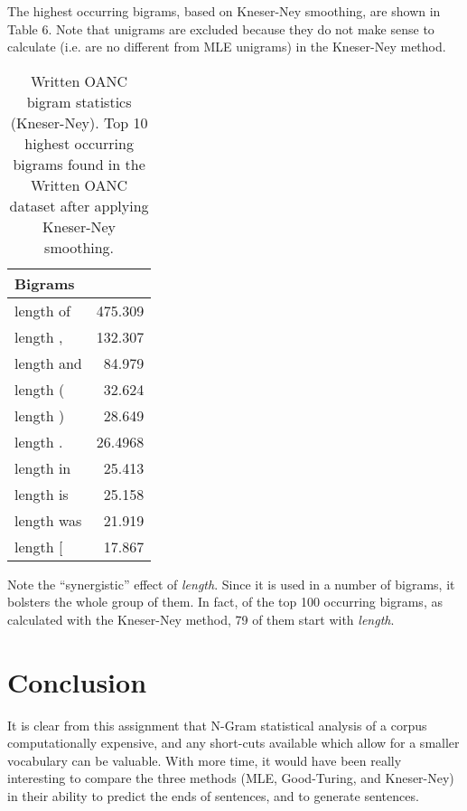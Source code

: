 \documentclass[11pt]{article}
\begin{document}
The highest occurring bigrams, based on Kneser-Ney smoothing, are shown in Table 6. Note
that unigrams are excluded because they do not make sense to calculate (i.e. are no different
from MLE unigrams) in the Kneser-Ney method.

\begin{table}[h]
\begin{center}
\begin{tabular}{|lr|}
\hline \bf Bigrams & \\ \hline
length of & 475.309  \\
length , & 132.307  \\
length and & 84.979  \\
length ( & 32.624  \\
length ) & 28.649   \\
length . & 26.4968  \\
length in & 25.413 \\
length is & 25.158 \\
length was & 21.919 \\
length [ & 17.867  \\
\hline
\end{tabular}
\end{center}
\caption{\label{tokenStats} Written OANC bigram statistics (Kneser-Ney).
Top 10 highest occurring bigrams found in the Written OANC dataset after
applying Kneser-Ney smoothing.}
\end{table}

Note the ``synergistic'' effect of {\em length}. Since it is used in a number
of bigrams, it bolsters the whole group of them.  In fact, of the top 100
occurring bigrams, as calculated with the Kneser-Ney method, 79 of them start
with {\em length}.

\section{Conclusion}
It is clear from this assignment that N-Gram statistical analysis of a corpus
computationally expensive, and any short-cuts available which allow for a
smaller vocabulary can be valuable. With more time, it would have been really
interesting to compare the three methods (MLE, Good-Turing, and Kneser-Ney) in
their ability to predict the ends of sentences, and to generate sentences.
\end{document}
